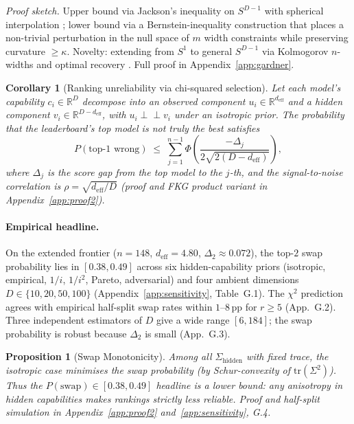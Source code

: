 \documentclass{article}
\newtheorem{corollary}{Corollary}
\newtheorem{proposition}{Proposition}
\begin{document}
\noindent \emph{Proof sketch.} Upper bound via Jackson's inequality
on $S^{D-1}$ \citep{ragozin1970polynomial} with spherical
interpolation \citep{dai2013approximation}; lower bound via a
Bernstein-inequality construction that places a non-trivial
perturbation in the null space of $m$ width constraints while
preserving curvature $\ge \kappa$. Novelty: extending from $S^1$ to
general $S^{D-1}$ via Kolmogorov $n$-widths and optimal recovery
\citep{magaril2006optimal}. Full proof in
Appendix~\ref{app:gardner}.

\begin{corollary}[Ranking unreliability via chi-squared selection]
\label{cor:body:rank}
Let each model's capability $c_i \in \mathbb{R}^D$ decompose into an
observed component $u_i \in \mathbb{R}^{d_{\mathrm{eff}}}$ and a hidden
component $v_i \in \mathbb{R}^{D - d_{\mathrm{eff}}}$, with $u_i
\perp\!\!\!\perp v_i$ under an isotropic prior. The probability that
the leaderboard's top model is not truly the best satisfies
\begin{equation}
\label{eq:topwrong}
  P(\text{top-1 wrong}) \;\le\;
  \sum_{j=1}^{n-1}
  \Phi\!\left(\frac{-\Delta_j}{2\sqrt{2(D - d_{\mathrm{eff}})}}\right),
\end{equation}
where $\Delta_j$ is the score gap from the top model to the $j$-th,
and the signal-to-noise correlation is $\rho = \sqrt{d_{\mathrm{eff}}
/ D}$ (proof and FKG product variant in Appendix~\ref{app:proof2}).
\end{corollary}

\paragraph{Empirical headline.}
On the extended frontier ($n = 148$, $d_{\mathrm{eff}} = 4.80$,
$\Delta_2 \approx 0.072$), the top-$2$ swap probability lies in
$[0.38, 0.49]$ across six hidden-capability priors (isotropic,
empirical, $1/i$, $1/i^2$, Pareto, adversarial) and four ambient
dimensions $D \in \{10, 20, 50, 100\}$
(Appendix~\ref{app:sensitivity}, Table~G.1). The $\chi^2$ prediction
agrees with empirical half-split swap rates within $1$--$8$\,pp for
$r \ge 5$ (App.~G.2). Three independent estimators of $D$ give a
wide range $[6, 184]$; the swap probability is robust because
$\Delta_2$ is small (App.~G.3).

\begin{proposition}[Swap Monotonicity]
\label{prop:body:swapmono}
Among all $\Sigma_{\mathrm{hidden}}$ with fixed trace, the isotropic
case \emph{minimises} the swap probability (by Schur-convexity of
$\mathrm{tr}(\Sigma^2)$). Thus the $P(\mathrm{swap}) \in [0.38, 0.49]$
headline is a \emph{lower bound}: any anisotropy in hidden capabilities
makes rankings strictly less reliable. Proof and half-split simulation
in Appendix~\ref{app:proof2} and~\ref{app:sensitivity}, G.4.
\end{proposition}
\end{document}
